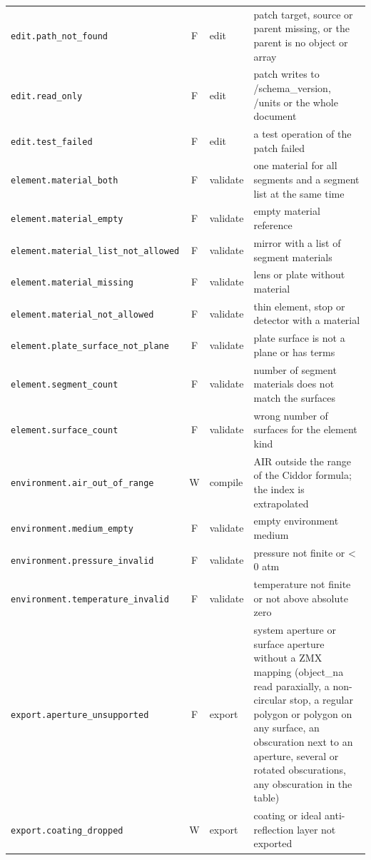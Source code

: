 \documentclass[11pt,a4paper,openany]{book}
\begin{document}
{\begin{longtable}{@{}L{6.1cm}cL{1.3cm}L{6.9cm}@{}}
\texttt{edit.path\_not\_found} & F & edit & patch target, source or parent missing, or the parent is no object or array \\
\texttt{edit.read\_only} & F & edit & patch writes to /schema\_version, /units or the whole document \\
\texttt{edit.test\_failed} & F & edit & a test operation of the patch failed \\
\texttt{element.material\_both} & F & validate & one material for all segments and a segment list at the same time \\
\texttt{element.material\_empty} & F & validate & empty material reference \\
\texttt{element.material\_list\_not\_allowed} & F & validate & mirror with a list of segment materials \\
\texttt{element.material\_missing} & F & validate & lens or plate without material \\
\texttt{element.material\_not\_allowed} & F & validate & thin element, stop or detector with a material \\
\texttt{element.plate\_surface\_not\_plane} & F & validate & plate surface is not a plane or has terms \\
\texttt{element.segment\_count} & F & validate & number of segment materials does not match the surfaces \\
\texttt{element.surface\_count} & F & validate & wrong number of surfaces for the element kind \\
\texttt{environment.air\_out\_of\_range} & W & compile & AIR outside the range of the Ciddor formula; the index is extrapolated \\
\texttt{environment.medium\_empty} & F & validate & empty environment medium \\
\texttt{environment.pressure\_invalid} & F & validate & pressure not finite or < 0 atm \\
\texttt{environment.temperature\_invalid} & F & validate & temperature not finite or not above absolute zero \\
\texttt{export.aperture\_unsupported} & F & export & system aperture or surface aperture without a ZMX mapping (object\_na read paraxially, a non-circular stop, a regular polygon or polygon on any surface, an obscuration next to an aperture, several or rotated obscurations, any obscuration in the table) \\
\texttt{export.coating\_dropped} & W & export & coating or ideal anti-reflection layer not exported \\

\end{longtable}}
\end{document}
